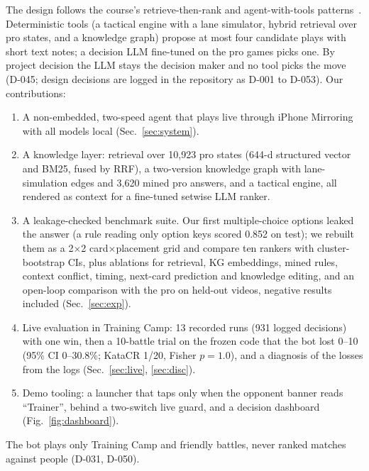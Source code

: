 \documentclass[conference]{IEEEtran}
\begin{document}
The design follows the course's retrieve-then-rank and agent-with-tools patterns~\cite{lim2026l11,lim2026l13,lim2026l15}. Deterministic tools (a tactical engine with a lane simulator, hybrid retrieval over pro states, and a knowledge graph) propose at most four candidate plays with short text notes; a decision LLM fine-tuned on the pro games picks one. By project decision the LLM stays the decision maker and no tool picks the move (D-045; design decisions are logged in the repository as D-001 to D-053). Our contributions:
\begin{enumerate}
\item A non-embedded, two-speed agent that plays live through iPhone Mirroring with all models local (Sec.~\ref{sec:system}).
\item A knowledge layer: retrieval over 10,923 pro states (644-d structured vector and BM25, fused by RRF), a two-version knowledge graph with lane-simulation edges and 3,620 mined pro answers, and a tactical engine, all rendered as context for a fine-tuned setwise LLM ranker. %
\item A leakage-checked benchmark suite. Our first multiple-choice options leaked the answer (a rule reading only option keys scored 0.852 on test); we rebuilt them as a 2$\times$2 card$\times$placement grid and compare ten rankers with cluster-bootstrap CIs, plus ablations for retrieval, KG embeddings, mined rules, context conflict, timing, next-card prediction and knowledge editing, and an open-loop comparison with the pro on held-out videos, negative results included (Sec.~\ref{sec:exp}). %
\item Live evaluation in Training Camp: 13 recorded runs (931 logged decisions) with one win, then a 10-battle trial on the frozen code that the bot lost 0--10 (95\% CI 0--30.8\%; KataCR 1/20, Fisher $p=1.0$), and a diagnosis of the losses from the logs (Sec.~\ref{sec:live}, \ref{sec:disc}). %
\item Demo tooling: a launcher that taps only when the opponent banner reads ``Trainer'', behind a two-switch live guard, and a decision dashboard (Fig.~\ref{fig:dashboard}).
\end{enumerate}
The bot plays only Training Camp and friendly battles, never ranked matches against people (D-031, D-050).
\end{document}
